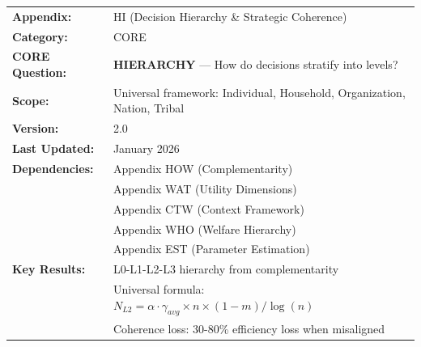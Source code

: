 %
%
%
%
%


\begin{tcolorbox}[colback=green!5!white, colframe=green!75!black,
    title=\textbf{CORE Appendix: Decision Hierarchy \& Strategic Coherence}]

\begin{tabular}{@{}ll@{}}
\textbf{Appendix:} & HI (Decision Hierarchy \& Strategic Coherence) \\
\textbf{Category:} & CORE \\
\textbf{CORE Question:} & \textbf{HIERARCHY} --- How do decisions stratify into levels? \\
\textbf{Scope:} & Universal framework: Individual, Household, Organization, Nation, Tribal \\
\textbf{Version:} & 2.0 \\
\textbf{Last Updated:} & January 2026 \\
\textbf{Dependencies:} & Appendix HOW (Complementarity) \\
 & Appendix WAT (Utility Dimensions) \\
 & Appendix CTW (Context Framework) \\
 & Appendix WHO (Welfare Hierarchy) \\
 & Appendix EST (Parameter Estimation) \\
\textbf{Key Results:} & L0-L1-L2-L3 hierarchy from complementarity \\
 & Universal formula: $N_{L2} = \alpha \cdot \gamma_{avg} \times n \times (1-m) / \log(n)$ \\
 & Coherence loss: 30-80\% efficiency loss when misaligned \\
\end{tabular}

\end{tcolorbox}

